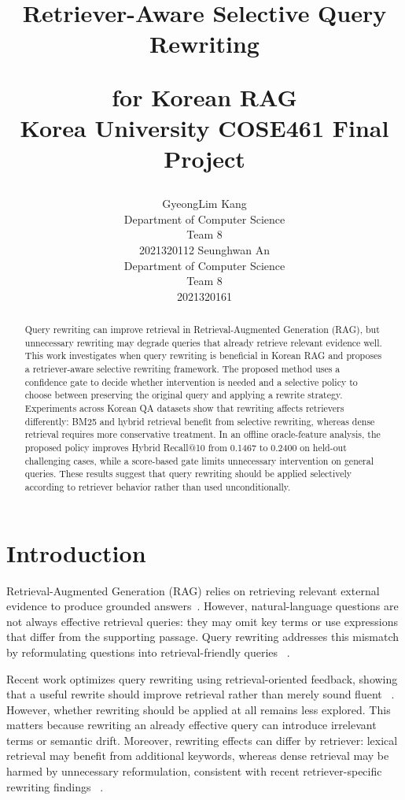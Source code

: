 \documentclass{article}
\title{
  Retriever-Aware Selective Query Rewriting
  
  for Korean RAG \\
  \vspace{1em}
  \small{\normalfont Korea University COSE461 Final Project}
}
\author{
   GyeongLim Kang \\
   Department of Computer Science \\
   Team 8 \\
   2021320112
   \And
   Seunghwan An \\
   Department of Computer Science \\
   Team 8 \\
   2021320161
}
\begin{document}
\maketitle

\begin{abstract}
Query rewriting can improve retrieval in Retrieval-Augmented Generation (RAG), but unnecessary rewriting may degrade queries that already retrieve relevant evidence well. This work investigates when query rewriting is beneficial in Korean RAG and proposes a retriever-aware selective rewriting framework. The proposed method uses a confidence gate to decide whether intervention is needed and a selective policy to choose between preserving the original query and applying a rewrite strategy. Experiments across Korean QA datasets show that rewriting affects retrievers differently: BM25 and hybrid retrieval benefit from selective rewriting, whereas dense retrieval requires more conservative treatment. In an offline oracle-feature analysis, the proposed policy improves Hybrid Recall@10 from 0.1467 to 0.2400 on held-out challenging cases, while a score-based gate limits unnecessary intervention on general queries. These results suggest that query rewriting should be applied selectively according to retriever behavior rather than used unconditionally.
\end{abstract}

\section{Introduction}

Retrieval-Augmented Generation (RAG) relies on retrieving relevant external 
evidence to produce grounded answers~\cite{lewis2020rag}. However, natural-language 
questions are not always effective retrieval queries: they may omit key terms or 
use expressions that differ from the supporting passage. Query rewriting addresses 
this mismatch by reformulating questions into retrieval-friendly queries
~\cite{ma2023rewrite,chan2024rqrag}.

Recent work optimizes query rewriting using retrieval-oriented feedback, showing 
that a useful rewrite should improve retrieval rather than merely sound fluent
~\cite{wu2022conqrr,mao2024rafe,zhu2025maferw}. However, whether rewriting 
should be applied at all remains less explored. This matters because rewriting an 
already effective query can introduce irrelevant terms or semantic drift. Moreover, 
rewriting effects can differ by retriever: lexical retrieval may benefit from 
additional keywords, whereas dense retrieval may be harmed by unnecessary 
reformulation, consistent with recent retriever-specific rewriting findings
~\cite{cha2025rlqr}.
\end{document}
